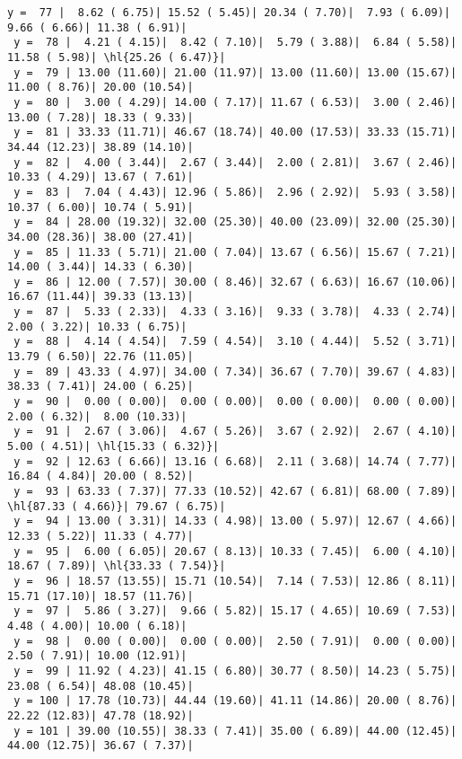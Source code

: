 \documentclass[10pt]{article}
\newcommand{\hl}[1]{\textcolor{blue}{#1}}
\begin{document}
\begin{Verbatim}[fontsize=\small, commandchars=\\\{\}]
 y =  77 |  8.62 ( 6.75)| 15.52 ( 5.45)| 20.34 ( 7.70)|  7.93 ( 6.09)|  9.66 ( 6.66)| 11.38 ( 6.91)|
 y =  78 |  4.21 ( 4.15)|  8.42 ( 7.10)|  5.79 ( 3.88)|  6.84 ( 5.58)| 11.58 ( 5.98)| \hl{25.26 ( 6.47)}|
 y =  79 | 13.00 (11.60)| 21.00 (11.97)| 13.00 (11.60)| 13.00 (15.67)| 11.00 ( 8.76)| 20.00 (10.54)|
 y =  80 |  3.00 ( 4.29)| 14.00 ( 7.17)| 11.67 ( 6.53)|  3.00 ( 2.46)| 13.00 ( 7.28)| 18.33 ( 9.33)|
 y =  81 | 33.33 (11.71)| 46.67 (18.74)| 40.00 (17.53)| 33.33 (15.71)| 34.44 (12.23)| 38.89 (14.10)|
 y =  82 |  4.00 ( 3.44)|  2.67 ( 3.44)|  2.00 ( 2.81)|  3.67 ( 2.46)| 10.33 ( 4.29)| 13.67 ( 7.61)|
 y =  83 |  7.04 ( 4.43)| 12.96 ( 5.86)|  2.96 ( 2.92)|  5.93 ( 3.58)| 10.37 ( 6.00)| 10.74 ( 5.91)|
 y =  84 | 28.00 (19.32)| 32.00 (25.30)| 40.00 (23.09)| 32.00 (25.30)| 34.00 (28.36)| 38.00 (27.41)|
 y =  85 | 11.33 ( 5.71)| 21.00 ( 7.04)| 13.67 ( 6.56)| 15.67 ( 7.21)| 14.00 ( 3.44)| 14.33 ( 6.30)|
 y =  86 | 12.00 ( 7.57)| 30.00 ( 8.46)| 32.67 ( 6.63)| 16.67 (10.06)| 16.67 (11.44)| 39.33 (13.13)|
 y =  87 |  5.33 ( 2.33)|  4.33 ( 3.16)|  9.33 ( 3.78)|  4.33 ( 2.74)|  2.00 ( 3.22)| 10.33 ( 6.75)|
 y =  88 |  4.14 ( 4.54)|  7.59 ( 4.54)|  3.10 ( 4.44)|  5.52 ( 3.71)| 13.79 ( 6.50)| 22.76 (11.05)|
 y =  89 | 43.33 ( 4.97)| 34.00 ( 7.34)| 36.67 ( 7.70)| 39.67 ( 4.83)| 38.33 ( 7.41)| 24.00 ( 6.25)|
 y =  90 |  0.00 ( 0.00)|  0.00 ( 0.00)|  0.00 ( 0.00)|  0.00 ( 0.00)|  2.00 ( 6.32)|  8.00 (10.33)|
 y =  91 |  2.67 ( 3.06)|  4.67 ( 5.26)|  3.67 ( 2.92)|  2.67 ( 4.10)|  5.00 ( 4.51)| \hl{15.33 ( 6.32)}|
 y =  92 | 12.63 ( 6.66)| 13.16 ( 6.68)|  2.11 ( 3.68)| 14.74 ( 7.77)| 16.84 ( 4.84)| 20.00 ( 8.52)|
 y =  93 | 63.33 ( 7.37)| 77.33 (10.52)| 42.67 ( 6.81)| 68.00 ( 7.89)| \hl{87.33 ( 4.66)}| 79.67 ( 6.75)|
 y =  94 | 13.00 ( 3.31)| 14.33 ( 4.98)| 13.00 ( 5.97)| 12.67 ( 4.66)| 12.33 ( 5.22)| 11.33 ( 4.77)|
 y =  95 |  6.00 ( 6.05)| 20.67 ( 8.13)| 10.33 ( 7.45)|  6.00 ( 4.10)| 18.67 ( 7.89)| \hl{33.33 ( 7.54)}|
 y =  96 | 18.57 (13.55)| 15.71 (10.54)|  7.14 ( 7.53)| 12.86 ( 8.11)| 15.71 (17.10)| 18.57 (11.76)|
 y =  97 |  5.86 ( 3.27)|  9.66 ( 5.82)| 15.17 ( 4.65)| 10.69 ( 7.53)|  4.48 ( 4.00)| 10.00 ( 6.18)|
 y =  98 |  0.00 ( 0.00)|  0.00 ( 0.00)|  2.50 ( 7.91)|  0.00 ( 0.00)|  2.50 ( 7.91)| 10.00 (12.91)|
 y =  99 | 11.92 ( 4.23)| 41.15 ( 6.80)| 30.77 ( 8.50)| 14.23 ( 5.75)| 23.08 ( 6.54)| 48.08 (10.45)|
 y = 100 | 17.78 (10.73)| 44.44 (19.60)| 41.11 (14.86)| 20.00 ( 8.76)| 22.22 (12.83)| 47.78 (18.92)|
 y = 101 | 39.00 (10.55)| 38.33 ( 7.41)| 35.00 ( 6.89)| 44.00 (12.45)| 44.00 (12.75)| 36.67 ( 7.37)|
\end{Verbatim}
\end{document}
